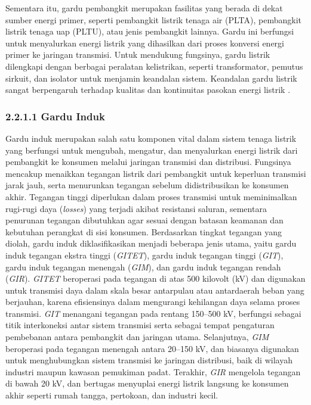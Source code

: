 Sementara itu, gardu pembangkit merupakan fasilitas yang berada di dekat sumber energi primer, seperti pembangkit listrik tenaga air (PLTA), pembangkit listrik tenaga uap (PLTU), atau jenis pembangkit lainnya. Gardu ini berfungsi untuk menyalurkan energi listrik yang dihasilkan dari proses konversi energi primer ke jaringan transmisi. Untuk mendukung fungsinya, gardu listrik dilengkapi dengan berbagai peralatan kelistrikan, seperti transformator, pemutus sirkuit, dan isolator untuk menjamin keandalan sistem. Keandalan gardu listrik sangat berpengaruh terhadap kualitas dan kontinuitas pasokan energi listrik \cite{gonen2016electric}.

\subsubsection{2.2.1.1 Gardu Induk}
Gardu induk merupakan salah satu komponen vital dalam sistem tenaga listrik yang berfungsi untuk mengubah, mengatur, dan menyalurkan energi listrik dari pembangkit ke konsumen melalui jaringan transmisi dan distribusi. Fungsinya mencakup menaikkan tegangan listrik dari pembangkit untuk keperluan transmisi jarak jauh, serta menurunkan tegangan sebelum didistribusikan ke konsumen akhir. Tegangan tinggi diperlukan dalam proses transmisi untuk meminimalkan rugi-rugi daya (\emph{losses}) yang terjadi akibat resistansi saluran, sementara penurunan tegangan dibutuhkan agar sesuai dengan batasan keamanan dan kebutuhan perangkat di sisi konsumen. Berdasarkan tingkat tegangan yang diolah, gardu induk diklasifikasikan menjadi beberapa jenis utama, yaitu gardu induk tegangan ekstra tinggi (\emph{GITET}), gardu induk tegangan tinggi (\emph{GIT}), gardu induk tegangan menengah (\emph{GIM}), dan gardu induk tegangan rendah (\emph{GIR}). \emph{GITET} beroperasi pada tegangan di atas 500 kilovolt (kV) dan digunakan untuk transmisi daya dalam skala besar antarpulau atau antardaerah beban yang berjauhan, karena efisiensinya dalam mengurangi kehilangan daya selama proses transmisi. \emph{GIT} menangani tegangan pada rentang 150--500 kV, berfungsi sebagai titik interkoneksi antar sistem transmisi serta sebagai tempat pengaturan pembebanan antara pembangkit dan jaringan utama. Selanjutnya, \emph{GIM} beroperasi pada tegangan menengah antara 20--150 kV, dan biasanya digunakan untuk menghubungkan sistem transmisi ke jaringan distribusi, baik di wilayah industri maupun kawasan pemukiman padat. Terakhir, \emph{GIR} mengelola tegangan di bawah 20 kV, dan bertugas menyuplai energi listrik langsung ke konsumen akhir seperti rumah tangga, pertokoan, dan industri kecil.

